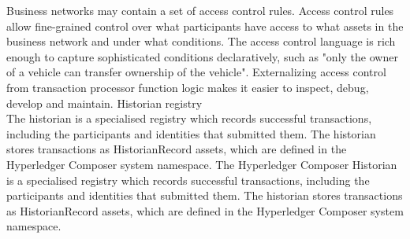 Business networks may contain a set of access control rules. Access control rules allow fine-grained control over what participants have access to what assets in the business network and under what conditions. The access control language is rich enough to capture sophisticated conditions declaratively, such as "only the owner of a vehicle can transfer ownership of the vehicle". Externalizing access control from transaction processor function logic makes it easier to inspect, debug, develop and maintain.
\medskip
Historian registry\\
The historian is a specialised registry which records successful transactions, including the participants and identities that submitted them. The historian stores transactions as HistorianRecord assets, which are defined in the Hyperledger Composer system namespace.
\medskip
The Hyperledger Composer Historian is a specialised registry which records successful transactions, including the participants and identities that submitted them. The historian stores transactions as HistorianRecord assets, which are defined in the Hyperledger Composer system namespace.
